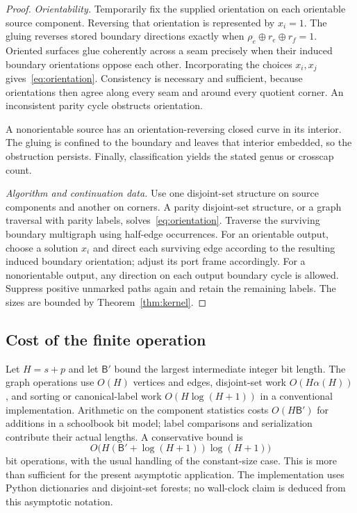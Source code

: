 \documentclass[11pt]{article}
\theoremstyle{definition}
\theoremstyle{remark}\newtheorem{remark}[theorem]{Remark}
\newcommand{\bits}{\mathsf B}
\begin{document}
\begin{proof}
\emph{Orientability.} Temporarily fix the supplied orientation on each orientable source component. Reversing that orientation is represented by $x_i=1$. The gluing reverses stored boundary directions exactly when $\rho_e\oplus r_e\oplus r_f=1$. Oriented surfaces glue coherently across a seam precisely when their induced boundary orientations oppose each other. Incorporating the choices $x_i,x_j$ gives~\eqref{eq:orientation}. Consistency is necessary and sufficient, because orientations then agree along every seam and around every quotient corner. An inconsistent parity cycle obstructs orientation.

A nonorientable source has an orientation-reversing closed curve in its interior. The gluing is confined to the boundary and leaves that interior embedded, so the obstruction persists. Finally, classification yields the stated genus or crosscap count.

\emph{Algorithm and continuation data.} Use one disjoint-set structure on source components and another on corners. A parity disjoint-set structure, or a graph traversal with parity labels, solves~\eqref{eq:orientation}. Traverse the surviving boundary multigraph using half-edge occurrences. For an orientable output, choose a solution $x_i$ and direct each surviving edge according to the resulting induced boundary orientation; adjust its port frame accordingly. For a nonorientable output, any direction on each output boundary cycle is allowed. Suppress positive unmarked paths again and retain the remaining labels. The sizes are bounded by Theorem~\ref{thm:kernel}.
\end{proof}

\subsection{Cost of the finite operation}
Let $H=s+p$ and let $\bits'$ bound the largest intermediate integer bit length. The graph operations use $O(H)$ vertices and edges, disjoint-set work $O(H\alpha(H))$, and sorting or canonical-label work $O(H\log(H+1))$ in a conventional implementation. Arithmetic on the component statistics costs $O(H\bits')$ for additions in a schoolbook bit model; label comparisons and serialization contribute their actual lengths. A conservative bound is
\[
      O\big(H(\bits'+\log(H+1))\log(H+1)\big)
\]
bit operations, with the usual handling of the constant-size case. This is more than sufficient for the present asymptotic application. The implementation uses Python dictionaries and disjoint-set forests; no wall-clock claim is deduced from this asymptotic notation.
\end{document}
